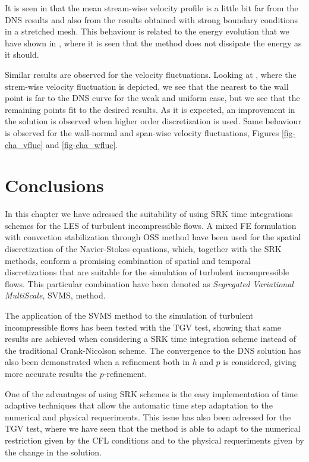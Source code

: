 It is seen in  that the mean stream-wise velocity profile is a little bit far from the DNS results and also from the results obtained with strong boundary conditions in a stretched mesh. This behaviour is related to the energy evolution that we have shown in , where it is seen that the method does not dissipate the energy as it should.

%
Similar results are observed for the velocity fluctuations. Looking at , where the strem-wise velocity fluctuation is depicted, we see that the nearest to the wall point is far to the DNS curve for the weak and uniform case, but we see that the remaining points fit to the desired results. As it is expected, an improvement in the solution is observed when higher order discretization is used. Same behaviour is observed for the wall-normal and span-wise velocity fluctuations, Figures \ref{fig-cha_vfluc} and \ref{fig-cha_wfluc}.

\section{Conclusions}
\label{sec-C7_conclusions}
In this chapter we have adressed the suitability of using SRK time integrations schemes for the LES of turbulent incompressible flows. A mixed FE formulation with convection stabilization through OSS method have been used for the spatial discretization of the Navier-Stokes equations, which, together with the SRK methods, conform a promising combination of spatial and temporal discretizations that are suitable for the simulation of turbulent incompressible flows. This particular combination have been denoted as \textit{Segregated Variational MultiScale}, SVMS, method.

The application of the SVMS method to the simulation of turbulent incompressible flows has been tested with the TGV test, showing that same results are achieved when considering a SRK time integration scheme instead of the traditional Crank-Nicolson scheme. The convergence to the DNS solution has also been demonstrated when a refinement both in $ h $ and $ p $ is considered, giving more accurate results the $ p $-refinement.

One of the advantages of using SRK schemes is the easy implementation of time adaptive techniques that allow the automatic time step adaptation to the numerical and physical requeriments. This issue has also been adressed for the TGV test, where we have seen that the method is able to adapt to the numerical restriction given by the CFL conditions and to the physical requeriments given by the change in the solution.

